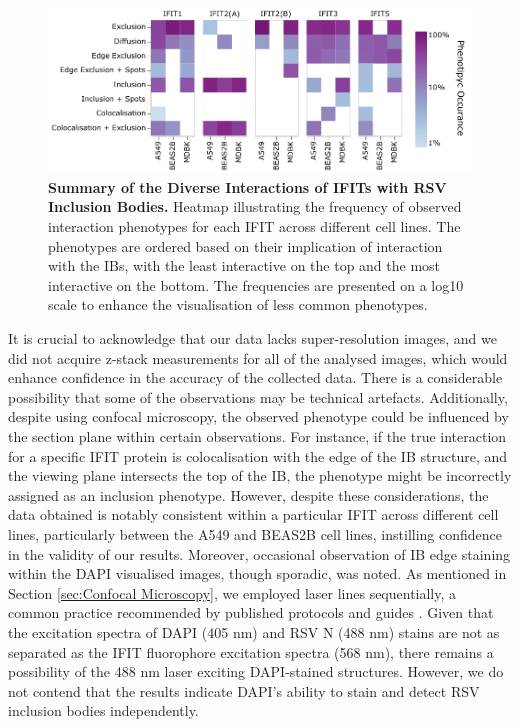 \begin{figure}
    \centering
    \includegraphics[width=1\linewidth]{08. Chapter 3/Figs/heatmap_infection.pdf}
    \caption[Summary of the Diverse Interactions of IFITs with RSV Inclusion Bodies.]{\textbf{Summary of the Diverse Interactions of IFITs with RSV Inclusion Bodies.} Heatmap illustrating the frequency of observed interaction phenotypes for each IFIT across different cell lines. The phenotypes are ordered based on their implication of interaction with the IBs, with the least interactive on the top and the most interactive on the bottom. The frequencies are presented on a log10 scale to enhance the visualisation of less common phenotypes.}
    \label{fig:Summary of the Diverse Interactions of IFITs with RSV Inclusion Bodies}
\end{figure}

It is crucial to acknowledge that our data lacks super-resolution images, and we did not acquire z-stack measurements for all of the analysed images, which would enhance confidence in the accuracy of the collected data. There is a considerable possibility that some of the observations may be technical artefacts. Additionally, despite using confocal microscopy, the observed phenotype could be influenced by the section plane within certain observations. For instance, if the true interaction for a specific IFIT protein is colocalisation with the edge of the IB structure, and the viewing plane intersects the top of the IB, the phenotype might be incorrectly assigned as an inclusion phenotype. However, despite these considerations, the data obtained is notably consistent within a particular IFIT across different cell lines, particularly between the A549 and BEAS2B cell lines, instilling confidence in the validity of our results. Moreover, occasional observation of IB edge staining within the DAPI visualised images, though sporadic, was noted. As mentioned in Section \ref{sec:Confocal Microscopy}, we employed laser lines sequentially, a common practice recommended by published protocols and guides \cite{Jonkman2020Tutorial:Microscopy}. Given that the excitation spectra of DAPI (405 nm) and RSV N (488 nm) stains are not as separated as the IFIT fluorophore excitation spectra (568 nm), there remains a possibility of the 488 nm laser exciting DAPI-stained structures. However, we do not contend that the results indicate DAPI's ability to stain and detect RSV inclusion bodies independently.


